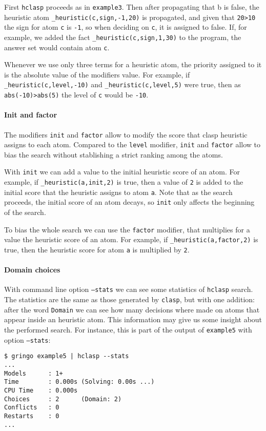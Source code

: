  First \texttt{hclasp} proceeds as in \texttt{example3}. Then after propagating that b is false,  the heuristic atom \texttt{\_heuristic(c,sign,-1,20)} is propagated, and given that \texttt{20>10} the sign for atom \texttt{c} is \texttt{-1}, so when deciding on \texttt{c}, it is assigned to false.  If, for example, we added the fact \texttt{\_heuristic(c,sign,1,30)} to the program, the answer set would contain atom \texttt{c}. 

 Whenever we use only three terms for a heuristic atom, the priority assigned to it is the absolute value of the modifiers value.  For example, if \texttt{\_heuristic(c,level,-10)} and \texttt{\_heuristic(c,level,5)} were true,  then as \texttt{abs(-10)>abs(5)} the level of \texttt{c} would be \texttt{-10}. 

\paragraph{Init and factor}

 The modifiers \texttt{init} and \texttt{factor} allow to modify the score that clasp heuristic assigns to each atom.  Compared to the \texttt{level} modifier, \texttt{init} and \texttt{factor} allow to bias the search without stablishing a strict ranking among the atoms. 

 With \texttt{init} we can add a value to the initial heuristic score of an atom. For example, if \texttt{\_heuristic(a,init,2)} is true, then a value of \texttt{2} is added to  the initial score that the heuristic assigns to atom \texttt{a}. Note that as the search proceeds, the initial score of an atom decays, so \texttt{init} only affects the beginning of the search. 

 To bias the whole search we can use the \texttt{factor} modifier,  that multiplies for a value the heuristic score of an atom. For example, if \texttt{\_heuristic(a,factor,2)} is true, then the heuristic score for atom \texttt{a}  is multiplied by \texttt{2}. 

\paragraph{Domain choices}

 With command line option \texttt{--stats} we can see some statistics of \texttt{hclasp} search. The statistics are the same as those generated by \texttt{clasp}, but with one addition:  after the word \texttt{Domain} we can see how many decisions where made on atoms that appear  inside an heuristic atom. This information may give us some insight about the performed search. For instance, this is part of the output of \texttt{example5} with option \texttt{--stats}: 
\begin{verbatim}
$ gringo example5 | hclasp --stats                                                                       
...
Models      : 1+    
Time        : 0.000s (Solving: 0.00s ...)
CPU Time    : 0.000s
Choices     : 2      (Domain: 2)
Conflicts   : 0
Restarts    : 0     
...
\end{verbatim}

